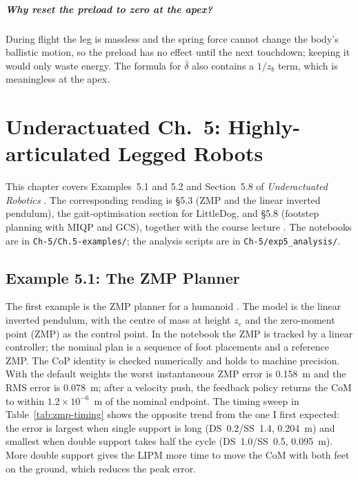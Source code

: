 \documentclass[11pt]{report}
\renewcommand{\chaptermark}[1]{\markboth{#1}{}}
\begin{document}
\paragraph{Why reset the preload to zero at the apex?}  During flight the leg
is massless and the spring force cannot change the body's ballistic motion, so
the preload has no effect until the next touchdown; keeping it would only waste
energy.  The formula for $\bar\delta$ also contains a $1/z_b$ term, which is
meaningless at the apex.

\chapter[Underactuated Ch.~5: Highly-articulated Legged Robots]%
        {Underactuated Ch.~5: Highly-articulated Legged Robots}
\chaptermark{Ch.~5: Legged Robots}

This chapter covers Examples~5.1 and 5.2 and Section~5.8 of
\emph{Underactuated Robotics} \cite{tedrake-humanoids}.  The corresponding
reading is \S5.3 (ZMP and the linear inverted pendulum), the gait-optimisation
section for LittleDog, and \S5.8 (footstep planning with MIQP and GCS),
together with the course lecture \cite{lectures}.  The notebooks are in \texttt{Ch-5/Ch.5-examples/}; the analysis scripts are in
\texttt{Ch-5/exp5\_analysis/}.

\section{Example 5.1: The ZMP Planner}
\label{sec:ex51}

The first example is the ZMP planner for a humanoid \cite{tedrake-humanoids}.  The model is the linear
inverted pendulum, with the centre of mass at height $z_c$ and the zero-moment
point (ZMP) as the control point.  In the notebook the ZMP is tracked by a
linear controller; the nominal plan is a sequence of foot placements and a
reference ZMP.  The CoP identity is checked numerically and holds to machine
precision.  With the default weights the worst instantaneous ZMP error is
0.158~m and the RMS error is 0.078~m; after a velocity push, the feedback
policy returns the CoM to within $1.2\times10^{-6}$~m of the nominal endpoint.
The timing sweep in Table~\ref{tab:zmp-timing} shows the opposite trend from
the one I first expected: the error is largest when single support is long
(DS~0.2/SS~1.4, 0.204~m) and smallest when double support takes half the cycle
(DS~1.0/SS~0.5, 0.095~m).  More double support gives the LIPM more time to move
the CoM with both feet on the ground, which reduces the peak error.
\end{document}
